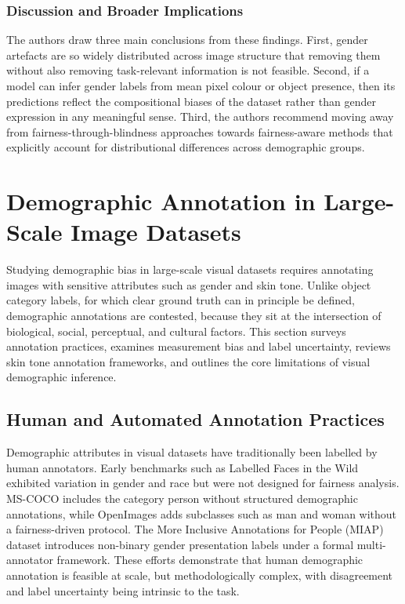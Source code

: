 \subsubsection*{Discussion and Broader Implications}
\label{subsubsec:meister_discussion}

The authors draw three main conclusions from these findings. First, gender artefacts are so widely distributed
across image structure that removing them without also removing task-relevant information is
not feasible. Second, if a model can infer gender labels from mean pixel colour or object presence,
then its predictions reflect the compositional biases of the dataset rather than gender
expression in any meaningful sense. Third, the authors recommend
moving away from fairness-through-blindness approaches towards fairness-aware methods that
explicitly account for distributional differences across demographic groups.

\section{Demographic Annotation in Large-Scale Image Datasets}
\label{sec:demographic_annotation_background}

Studying demographic bias in large-scale visual datasets requires annotating images with sensitive attributes such as gender and skin tone. Unlike object category labels, for which clear ground truth can in principle be defined, demographic annotations are contested, because they sit at the intersection of biological, social, perceptual, and cultural factors. This section surveys annotation practices, examines measurement bias and label uncertainty, reviews skin tone annotation frameworks, and outlines the core limitations of visual demographic inference.

\subsection{Human and Automated Annotation Practices}
\label{subsec:annotation_practices}

Demographic attributes in visual datasets have traditionally been labelled by human annotators. Early benchmarks such as Labelled Faces in the Wild \cite{Huang_2007_LFW} exhibited variation in gender and race but were not designed for fairness analysis. MS-COCO \cite{Lin_2014_COCO} includes the category person without structured demographic annotations, while OpenImages \cite{Kuznetsova_2020_OpenImagesV4} adds subclasses such as man and woman without a fairness-driven protocol. The More Inclusive Annotations for People (MIAP) dataset \cite{Schumann_2021_StepInclusivePeopleAnnotations} introduces non-binary gender presentation labels under a formal multi-annotator framework. These efforts demonstrate that human demographic annotation is feasible at scale, but methodologically complex, with disagreement and label uncertainty being intrinsic to the task.

